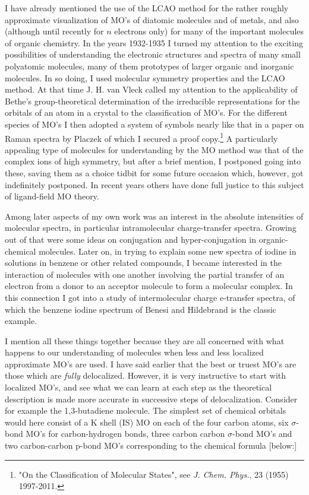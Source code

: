 \documentclass[11pt]{memoir}
\begin{document}
I have already mentioned the use of the LCAO method for the rather roughly approximate visualization of MO's of diatomic molecules and of metals, and also (although until recently for $n$ electrons only) for many of the important molecules of organic chemistry.  In the years 1932-1935 I turned my attention to the exciting possibilities of understanding the electronic structures and spectra of many small polyatomic molecules, many of them prototypes of larger organic and inorganic molecules.  In so doing, I used molecular symmetry properties and the LCAO method.  At that time J. H. van Vleck called my attention to the applicability of Bethe's group-theoretical determination of the irreducible representations for the orbitals of an atom in a crystal to the classification of MO's.  For the different species of MO's I then adopted a system of symbols nearly like that in a paper on Raman spectra by Placzek of which I secured a proof copy.\footnote{"On the Classification of Molecular States", see \emph{J. Chem. Phys.}, 23 (1955) 1997-2011.}  A particularly appealing type of molecules for understanding by the MO method was that of the complex ions of high symmetry, but after a brief mention, I postponed going into these, saving them as a choice tidbit for some future occasion which, however, got indefinitely postponed.  In recent years others have done full justice to this subject of ligand-field MO theory.

Among later aspects of my own work was an interest in the absolute intensities of molecular spectra, in particular intramolecular charge-transfer spectra.  Growing out of that were some ideas on conjugation and hyper-conjugation in organic-chemical molecules.  Later on, in trying to explain some new spectra of iodine in solutions in benzene or other related compounds, I became interested in the interaction of molecules with one another involving the partial transfer of an electron from a donor to an acceptor molecule to form a molecular complex.  In this connection I got into a study of intermolecular charge e-transfer spectra, of which the benzene iodine spectrum of Benesi and Hildebrand is the classic example.

I mention all these things together because they are all concerned with what happens to our understanding of molecules when less and less localized approximate MO's are used.  I have said earlier that the best or truest MO's are those which are \emph{fully} delocalized.  However, it is very instructive to start with localized MO's, and see what we can learn at each step as the theoretical description is made more accurate in successive steps of delocalization.  Consider for example the 1,3-butadiene molecule.  The simplest set of chemical orbitals would here consist of a K shell (IS) MO on each of the four carbon atoms, six $\sigma$-bond MO's for carbon-hydrogen bonds, three carbon carbon $\sigma$-bond MO's and two carbon-carbon p-bond MO's corresponding to the chemical formula [below:]
\end{document}
